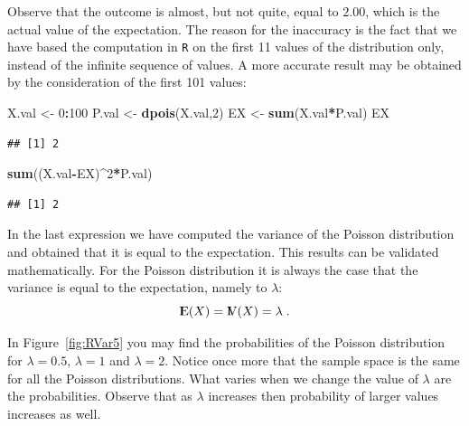 \documentclass[]{krantz}
\makeatletter
\newenvironment{Shaded}{\begin{snugshade}}{\end{snugshade}}
\newcommand{\DecValTok}[1]{\textcolor[rgb]{0.00,0.00,0.81}{#1}}
\newcommand{\KeywordTok}[1]{\textcolor[rgb]{0.13,0.29,0.53}{\textbf{#1}}}
\newcommand{\NormalTok}[1]{#1}
\newcommand{\OperatorTok}[1]{\textcolor[rgb]{0.81,0.36,0.00}{\textbf{#1}}}
\newcommand{\StringTok}[1]{\textcolor[rgb]{0.31,0.60,0.02}{#1}}
\newcommand{\Expec}{{\rm I\kern-.3em E}}
\newcommand{\Var}{{\rm I\kern-.3em V}}
\newenvironment{kframe}{%
\medskip{}
\setlength{\fboxsep}{.8em}
 \def\at@end@of@kframe{}%
 \ifinner\ifhmode%
  \def\at@end@of@kframe{\end{minipage}}%
  \begin{minipage}{\columnwidth}%
 \fi\fi%
 \def\FrameCommand##1{\hskip\@totalleftmargin \hskip-\fboxsep
 \colorbox{shadecolor}{##1}\hskip-\fboxsep
     \hskip-\linewidth \hskip-\@totalleftmargin \hskip\columnwidth}%
 \MakeFramed {\advance\hsize-\width
   \@totalleftmargin\z@ \linewidth\hsize
   \@setminipage}}%
 {\par\unskip\endMakeFramed%
 \at@end@of@kframe}
\renewenvironment{Shaded}{\begin{kframe}}{\end{kframe}}
\theoremstyle{definition}
\theoremstyle{definition}
\theoremstyle{definition}
\theoremstyle{remark}
\makeatother
\begin{document}
Observe that the outcome is almost, but not quite, equal to \(2.00\),
which is the actual value of the expectation. The reason for the
inaccuracy is the fact that we have based the computation in \texttt{R} on the
first 11 values of the distribution only, instead of the infinite
sequence of values. A more accurate result may be obtained by the
consideration of the first 101 values:

\begin{Shaded}
\begin{Highlighting}[]
\NormalTok{X.val <-}\StringTok{ }\DecValTok{0}\OperatorTok{:}\DecValTok{100}
\NormalTok{P.val <-}\StringTok{ }\KeywordTok{dpois}\NormalTok{(X.val,}\DecValTok{2}\NormalTok{)}
\NormalTok{EX <-}\StringTok{ }\KeywordTok{sum}\NormalTok{(X.val}\OperatorTok{*}\NormalTok{P.val)}
\NormalTok{EX}
\end{Highlighting}
\end{Shaded}

\begin{verbatim}
## [1] 2
\end{verbatim}

\begin{Shaded}
\begin{Highlighting}[]
\KeywordTok{sum}\NormalTok{((X.val}\OperatorTok{-}\NormalTok{EX)}\OperatorTok{^}\DecValTok{2}\OperatorTok{*}\NormalTok{P.val)}
\end{Highlighting}
\end{Shaded}

\begin{verbatim}
## [1] 2
\end{verbatim}

In the last expression we have computed the variance of the Poisson
distribution and obtained that it is equal to the expectation. This
results can be validated mathematically. For the Poisson distribution it
is always the case that the variance is equal to the expectation, namely
to \(\lambda\): \[\Expec(X) = \Var(X) = \lambda\;.\]

In Figure~\ref{fig:RVar5} you may find the probabilities of the
Poisson distribution for \(\lambda = 0.5\), \(\lambda = 1\) and
\(\lambda = 2\). Notice once more that the sample space is the same for
all the Poisson distributions. What varies when we change the value of
\(\lambda\) are the probabilities. Observe that as \(\lambda\) increases
then probability of larger values increases as well.
\end{document}

